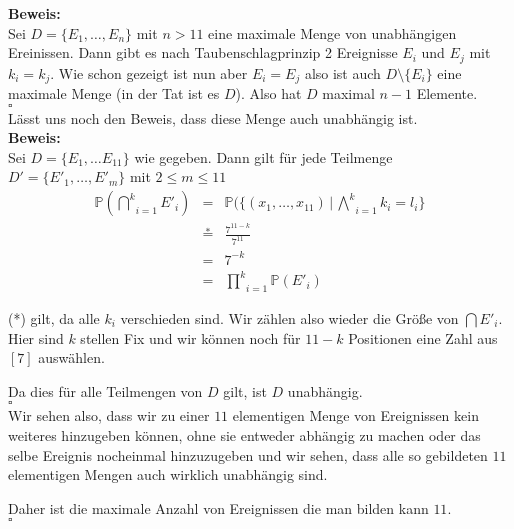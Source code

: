 \documentclass[11pt,a4paper,ngerman]{article}
\newcommand{\Prob}{\mathbb{P}}
\begin{document}
\textbf{Beweis:}\\
Sei $D = \{E_1, \ldots, E_{n} \}$ mit $n>11$ eine maximale Menge von unabhängigen Ereinissen. Dann gibt es nach Taubenschlagprinzip 2 Ereignisse $E_i$ und $E_j$ mit
$k_i = k_j$. Wie schon gezeigt ist nun aber $E_i = E_j$ also ist auch $D \setminus \{ E_i \}$ eine maximale Menge (in der Tat ist es $D$).
Also hat $D$ maximal $n-1$ Elemente.\\
\mbox{}\hfill$\square$\\

Lässt uns noch den Beweis, dass diese Menge auch unabhängig ist.\\
\textbf{Beweis:}\\
Sei $D = \{E_1, \ldots E_{11}\}$ wie gegeben. Dann gilt für jede Teilmenge $D' = \{E'_1, \ldots, E'_m\}$ mit $2\leq m \leq 11$
\[
    \begin{array}{rcl}
        \Prob(\underset{i=1}{\overset{k}{\bigcap}} E'_i) &=& \Prob(\{ (x_1, \ldots, x_{11}) \, | \, \underset{i=1}{\overset{k}{\bigwedge}} k_i = l_i\}\\
            &\stackrel{*}{=}& \frac{7^{11-k}}{7^11}\\
            &=& 7^{-k}\\
            &=& \underset{i=1}{\overset{k}{\prod}} \Prob(E'_i)
    \end{array}
\]

(*) gilt, da alle $k_i$ verschieden sind. Wir zählen also wieder die Größe von $\bigcap E'_i$. Hier sind $k$ stellen Fix und wir können noch
für $11-k$ Positionen eine Zahl aus $[7]$ auswählen.

Da dies für alle Teilmengen von $D$ gilt, ist $D$ unabhängig.\\
\mbox{}\hfill$\square$\\


Wir sehen also, dass wir zu einer $11$ elementigen Menge von Ereignissen kein weiteres hinzugeben können, ohne sie entweder abhängig zu machen oder
das selbe Ereignis nocheinmal hinzuzugeben und wir sehen, dass alle so gebildeten $11$ elementigen Mengen auch wirklich unabhängig sind.

Daher ist die maximale Anzahl von Ereignissen die man bilden kann $11$.\\
\mbox{}\hfill$\square$

\label{LastPage}
\end{document}

